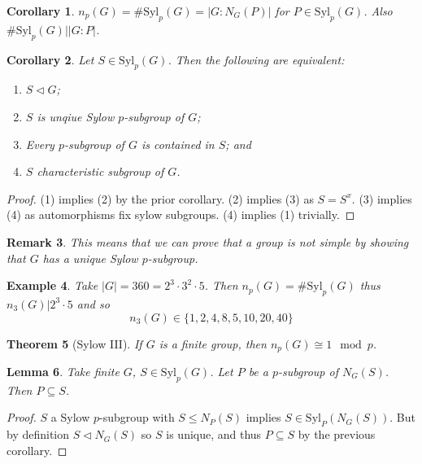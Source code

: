 \documentclass[a4paper,10pt]{article}
\newtheorem{thm}{Theorem}
\newtheorem{Cor}[thm]{Corollary}
\newtheorem{eg}[thm]{Example}
\newtheorem{Lem}[thm]{Lemma}
\newtheorem{rem}[thm]{Remark}
\begin{document}
\begin{Cor}
$n_p(G) = \# \text{Syl}_p(G) = | G : N_G(P) |$ for $P \in \text{Syl}_p(G)$. Also $\# \text{Syl}_p(G) \big| |G :P|$.
\end{Cor}


\begin{Cor}
Let $S \in \text{Syl}_p(G)$. Then the following are equivalent:
\begin{enumerate}
\item $S \triangleleft G$;
\item $S$ is unqiue Sylow $p$-subgroup of $G$;
\item Every $p$-subgroup of $G$ is contained in $S$; and
\item $S$ characteristic subgroup of $G$.
\end{enumerate}

\end{Cor}

\begin{proof}
(1) implies (2) by the prior corollary. (2) implies (3) as $S = S^x$. (3) implies (4) as automorphisms fix sylow subgroups. (4) implies (1) trivially. 
\end{proof}

\begin{rem}
This means that we can prove that a group is not simple by showing that $G$ has a unique Sylow $p$-subgroup.
\end{rem}

\begin{eg}
Take $|G| = 360 = 2^3 \cdot 3^2 \cdot 5$. Then $n_p(G) = \# \text{Syl}_p(G)$ thus $ n_3(G) \big| 2^3 \cdot 5$ and so
\[ n_3(G) \in \{ 1,2,4,8,5,10,20,40\} \]
\end{eg}


\begin{thm}[Sylow III]
If $G$ is a finite group, then $n_p(G) \cong 1 \mod p$.
\end{thm}

\begin{Lem}
Take finite $G$, $S \in \text{Syl}_p(G)$. Let $P$ be a $p$-subgroup of $N_G(S)$. Then $P \subseteq S$. 
\end{Lem}
\begin{proof}
$S$ a Sylow $p$-subgroup with $S \leq N_P(S)$ implies $S \in \text{Syl}_P(N_G(S))$. But by definition $S \triangleleft N_G(S)$ so $S$ is unique, and thus $P \subseteq S$ by the previous corollary. 
\end{proof}
\end{document}
